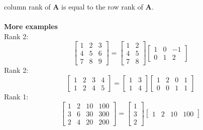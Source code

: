 \documentclass{report}
\begin{document}
column rank of $\bm A$ is equal to the row rank of $\bm A$.\\
\vspace{1mm}\\
\textbf{More examples}\\
Rank 2:
\begin{equation*}
\left[\begin{array}{ccc}
1&2&3\\
4&5&6\\
7&8&9
\end{array}\right]=
\left[\begin{array}{cc}
1&2\\
4&5\\
7&8
\end{array}\right]
\left[\begin{array}{ccc}
1&0&-1\\
0&1&2
\end{array}\right]
\end{equation*}
Rank 2:
\begin{equation*}
\left[\begin{array}{cccc}
1&2&3&4\\
1&2&4&5
\end{array}\right]=
\left[\begin{array}{cc}
1&3\\
1&4
\end{array}\right]
\left[\begin{array}{cccc}
1&2&0&1\\
0&0&1&1
\end{array}\right]
\end{equation*}
Rank 1:
\begin{equation*}
\left[\begin{array}{cccc}
1&2&10&100\\
3&6&30&300\\
2&4&20&200
\end{array}\right]=
\left[\begin{array}{c}
1\\3\\2
\end{array}\right]
\left[\begin{array}{cccc}
1&2&10&100
\end{array}\right]
\end{equation*}
\newpage
\end{document}
